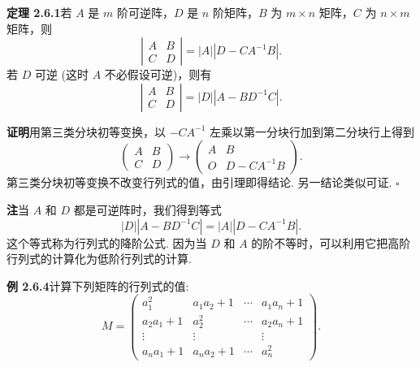 \documentclass[UTF8,12pt,a4paper,fontset=fandol]{ctexart}
\begin{document}
\noindent\textbf{定理 2.6.1}\quad 若 $A$ 是 $m$ 阶可逆阵，$D$ 是 $n$ 阶矩阵，$B$ 为 $m\times n$ 矩阵，$C$ 为 $n\times m$ 矩阵，则
\[
\left|\begin{array}{cc}
A & B\\
C & D
\end{array}\right|=|A||D-CA^{-1}B|.
\]
若 $D$ 可逆 (这时 $A$ 不必假设可逆)，则有
\[
\left|\begin{array}{cc}
A & B\\
C & D
\end{array}\right|=|D||A-BD^{-1}C|.
\]

\noindent\textbf{证明}\quad 用第三类分块初等变换，以 $-CA^{-1}$ 左乘以第一分块行加到第二分块行上得到
\[
\left(\begin{array}{cc}
A & B\\
C & D
\end{array}\right)\longrightarrow
\left(\begin{array}{cc}
A & B\\
O & D-CA^{-1}B
\end{array}\right).
\]
第三类分块初等变换不改变行列式的值，由引理即得结论. 另一结论类似可证. $\square$

\noindent\textbf{注}\quad 当 $A$ 和 $D$ 都是可逆阵时，我们得到等式
\[
|D||A-BD^{-1}C|=|A||D-CA^{-1}B|.
\]
这个等式称为行列式的降阶公式. 因为当 $D$ 和 $A$ 的阶不等时，可以利用它把高阶行列式的计算化为低阶行列式的计算.

\noindent\textbf{例 2.6.4}\quad 计算下列矩阵的行列式的值:
\[
M=\left(\begin{array}{cccc}
a_1^2 & a_1a_2+1 & \cdots & a_1a_n+1\\
a_2a_1+1 & a_2^2 & \cdots & a_2a_n+1\\
\vdots & \vdots & & \vdots\\
a_na_1+1 & a_na_2+1 & \cdots & a_n^2
\end{array}\right).
\]
\end{document}
